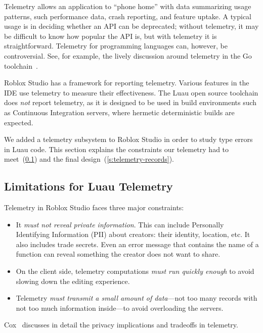 \documentclass[english,submission,cleveref]{programming}
\begin{document}
Telemetry allows an application to ``phone home'' with data
summarizing usage patterns, such performance data, crash reporting,
and feature uptake. A typical usage is in deciding whether an API can
be deprecated; without telemetry, it may be difficult to know how
popular the API is, but with telemetry it is straightforward.
Telemetry for programming languages can, however, be controversial.
See, for example, the lively discussion around telemetry in the Go
toolchain~\cite{golang-telemetry}.

Roblox Studio has a framework for reporting telemetry.
Various features in the IDE use telemetry to measure their effectiveness.
The Luau open source toolchain does \emph{not} report telemetry,
as it is designed to be used in build environments such as Continuous Integration
servers, where hermetic deterministic builds are expected.

We added a telemetry subsystem to Roblox Studio in order to study type errors
in Luau code.
This section explains the constraints our telemetry had to meet~(\cref{s:tel-limitations})
and the final design~(\cref{s:telemetry-records}).


\subsection{Limitations for Luau Telemetry}
\label{s:tel-limitations}

Telemetry in Roblox Studio faces three major constraints:
\begin{itemize}

  \item
    It \emph{must not reveal private information}.
    This can include Personally Identifying Information (PII) about creators: their identity, location, etc.
    It also includes trade secrets. Even an error message that contains the
    name of a function can reveal something the creator does not want to share.

  \item
    On the client side, telemetry computations \emph{must run quickly enough} to avoid
    slowing down the editing experience.

  \item
    Telemetry \emph{must transmit a small amount of data}---not too many records
    with not too much information inside---to avoid overloading the servers.

\end{itemize}
Cox~\cite{transparent-telemetry} discusses in detail the privacy implications
and tradeoffs in telemetry.
\end{document}
